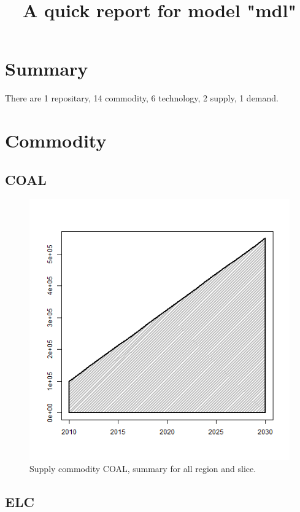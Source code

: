 \documentclass{article}
\title{A quick report for model "mdl"}
\begin{document}
\maketitle


\section{Summary}


There are 1 repositary, 14 commodity, 6 technology, 2 supply, 1 demand.

\tableofcontents


\section{Commodity}


\subsection{COAL}


\begin{figure}[H]
  \centering
  \includegraphics[width = 5in]{COAL_supply.png}
  \caption{Supply commodity COAL, summary for all region and slice.}
\end{figure}



\subsection{ELC}
\end{document}

